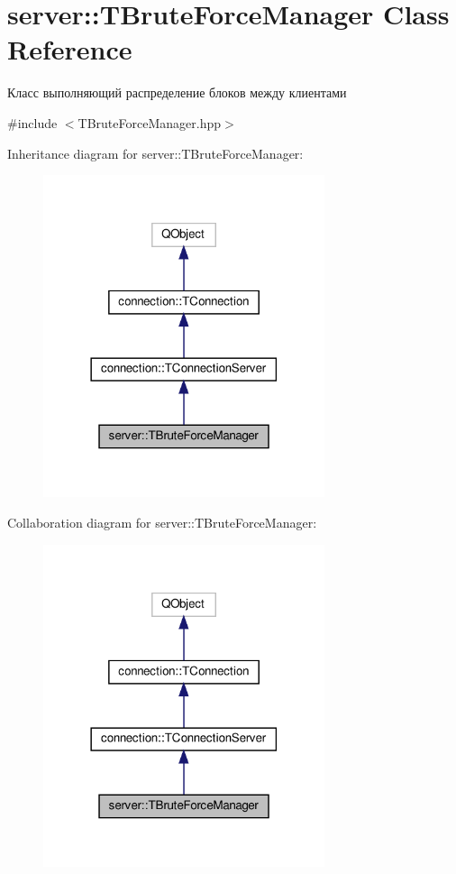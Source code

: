 \hypertarget{classserver_1_1_t_brute_force_manager}{}\section{server\+:\+:T\+Brute\+Force\+Manager Class Reference}
\label{classserver_1_1_t_brute_force_manager}


Класс выполняющий распределение блоков между клиентами  




{\ttfamily \#include $<$T\+Brute\+Force\+Manager.\+hpp$>$}



Inheritance diagram for server\+:\+:T\+Brute\+Force\+Manager\+:\nopagebreak
\begin{figure}[H]
\begin{center}
\leavevmode
\includegraphics[width=234pt]{classserver_1_1_t_brute_force_manager__inherit__graph}
\end{center}
\end{figure}


Collaboration diagram for server\+:\+:T\+Brute\+Force\+Manager\+:\nopagebreak
\begin{figure}[H]
\begin{center}
\leavevmode
\includegraphics[width=234pt]{classserver_1_1_t_brute_force_manager__coll__graph}
\end{center}
\end{figure}

